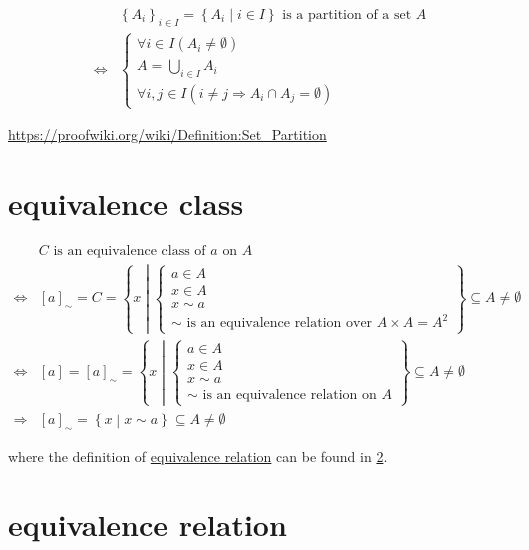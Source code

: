 \documentclass[
]{book}
\theoremstyle{definition}
\theoremstyle{definition}
\theoremstyle{definition}
\theoremstyle{definition}
\theoremstyle{remark}
\begin{document}
\begin{align*}
 & \left\{ A_{i}\right\} _{i\in I}=\left\{ A_{i}\middle|i\in I\right\} \text{ is a partition of a set }A\\
\Leftrightarrow & \begin{cases}
\forall i\in I\left(A_{i}\ne\emptyset\right)\\
A=\bigcup\limits _{i\in I}A_{i}\\
\forall i,j\in I\left(i\ne j\Rightarrow A_{i}\cap A_{j}=\emptyset\right)
\end{cases}
\end{align*}

\url{https://proofwiki.org/wiki/Definition:Set_Partition}

\hypertarget{equivalence-class}{%
\chapter{equivalence class}\label{equivalence-class}}

\begin{align*}
 & C\text{ is an equivalence class of }a\text{ on }A\\
\Leftrightarrow & \left[a\right]_{\sim}=C=\left\{ x\middle|\begin{cases}
a\in A\\
x\in A\\
x\sim a\\
\sim\text{ is an equivalence relation over }A\times A=A^{2}
\end{cases}\right\} \subseteq A\ne\emptyset\\
\Leftrightarrow & \left[a\right]=\left[a\right]_{\sim}=\left\{ x\middle|\begin{cases}
a\in A\\
x\in A\\
x\sim a\\
\sim\text{ is an equivalence relation on }A
\end{cases}\right\} \subseteq A\ne\emptyset\\
\Rightarrow & \left[a\right]_{\sim}=\left\{ x\middle|x\sim a\right\} \subseteq A\ne\emptyset
\end{align*}

where the definition of \protect\hyperlink{equivalence-relation}{equivalence relation} can be found in \ref{equivalence-relation}.

\hypertarget{equivalence-relation}{%
\chapter{equivalence relation}\label{equivalence-relation}}
\end{document}
